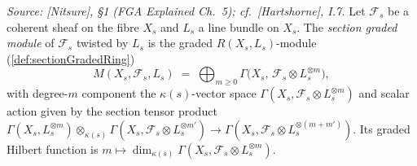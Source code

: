 \begin{definition}
  \label{def:sectionGradedModule}
  \textit{Source: [Nitsure], \S 1 (FGA Explained Ch.~5); cf.\ [Hartshorne],
  I.7.}
  Let \(\mathcal{F}_s\) be a coherent sheaf on the fibre \(X_s\) and \(L_s\) a
  line bundle on \(X_s\). The \emph{section graded module} of \(\mathcal{F}_s\)
  twisted by \(L_s\) is the graded \(R(X_s, L_s)\)-module
  (\cref{def:sectionGradedRing})
  \[
    M(X_s, \mathcal{F}_s, L_s)
    \;=\; \bigoplus_{m \ge 0} \Gamma\bigl(X_s,\, \mathcal{F}_s \otimes L_s^{\otimes m}\bigr),
  \]
  with degree-\(m\) component the \(\kappa(s)\)-vector space
  \(\Gamma(X_s, \mathcal{F}_s \otimes L_s^{\otimes m})\) and scalar action given
  by the section tensor product
  \(\Gamma(X_s, L_s^{\otimes m}) \otimes_{\kappa(s)}
  \Gamma(X_s, \mathcal{F}_s \otimes L_s^{\otimes m'})
  \to \Gamma(X_s, \mathcal{F}_s \otimes L_s^{\otimes (m+m')})\). Its graded Hilbert
  function is \(m \mapsto \dim_{\kappa(s)}
  \Gamma(X_s, \mathcal{F}_s \otimes L_s^{\otimes m})\).
\end{definition}

